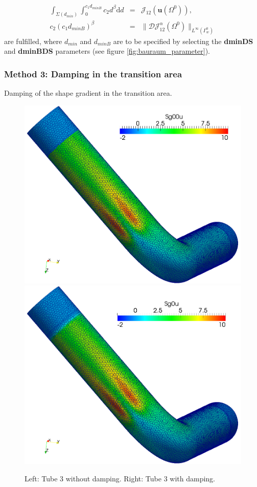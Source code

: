 \documentclass[oneside]{article}
\numberwithin{equation}{section}
\numberwithin{figure}{section}
\newcommand{\Om }{ \Omega}
\newcommand{\buu}{\boldsymbol{u}}
\newcommand{\DD }{ \mathcal{D}}
\newcommand{\JJ }{ \mathcal{J}}
\numberwithin{figure}{section}
\begin{document}
\begin{eqnarray}
\int_{\Sigma\left(d_{min}\right)}\int_0^{c_1 d_{minB}} c_2 d^{\beta} \text{d}d &=& \JJ_{12}\left( \buu \left( \Om^0 \right) \right), \\
c_2\left(c_1 d_{minB}\right)^\beta &=& \lVert \DD \JJ_{12}^\alpha \left( \Om^{0}  \right) \rVert_{L^\infty \left(\Gamma_w^0\right)}
\end{eqnarray}
are fulfilled, where $d_{min}$ and $d_{minB}$ are to be specified by selecting the \textbf{dminDS} and \textbf{dminBDS} parameters (see figure \ref{fig:bauraum_parameter}).

\subsubsection{Method 3: Damping in the transition area}
Damping of the shape gradient in the transition area.
\begin{figure}[htbp]
    \centering
    \includegraphics[scale=0.16]{Rohr3_damp0.png} 
    \includegraphics[scale=0.16]{Rohr3_damp1.png} 
    \caption{Left: Tube 3 without damping. Right: Tube 3 with damping.} 
\end{figure}
\end{document}
